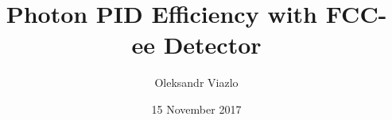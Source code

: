 \documentclass[8pt]{beamer}
\newif\ifplacelogo %
\begin{document}
\newcommand{\myNode}{\tikz[baseline,inner sep=1pt] \node[anchor=base]}



\title[ Photon PID Efficiency with FCC-ee Detector \hspace{12.5em}\insertframenumber/
\inserttotalframenumber]{ Photon PID Efficiency with FCC-ee Detector }


	\author[Oleksandr Viazlo]{Oleksandr Viazlo \\ 
	}
	
       
	\date{15 November 2017}


	
   	\frame{\titlepage}

   	

\placelogofalse
\end{document}
